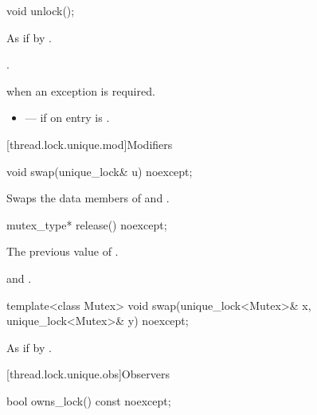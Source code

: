 %
\begin{itemdecl}
void unlock();
\end{itemdecl}

\begin{itemdescr}
\pnum
\effects
As if by .

\pnum
\ensures
{}.

\pnum
\throws
{} when
an exception is required.

\pnum
\errors
\begin{itemize}
\item {} --- if on entry  is .
\end{itemize}
\end{itemdescr}

[thread.lock.unique.mod]{Modifiers}

%
\begin{itemdecl}
void swap(unique_lock& u) noexcept;
\end{itemdecl}

\begin{itemdescr}
\pnum
\effects
Swaps the data members of  and .
\end{itemdescr}

%
\begin{itemdecl}
mutex_type* release() noexcept;
\end{itemdecl}

\begin{itemdescr}
\pnum
\returns
The previous value of .

\pnum
\ensures
{} and .
\end{itemdescr}

%
\begin{itemdecl}
template<class Mutex>
  void swap(unique_lock<Mutex>& x, unique_lock<Mutex>& y) noexcept;
\end{itemdecl}

\begin{itemdescr}
\pnum
\effects
As if by .
\end{itemdescr}

[thread.lock.unique.obs]{Observers}

%
\begin{itemdecl}
bool owns_lock() const noexcept;
\end{itemdecl}

